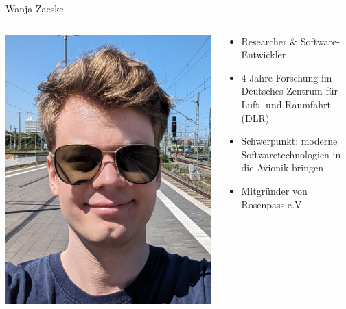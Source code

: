 \begin{frame}{Wanja Zaeske}
  \begin{columns}[fullwidth,c]
    \begin{column}{.3\linewidth}
      \includegraphics[width=.92\linewidth]{graphics/wanja-zaeske.png}
    \end{column}
    \begin{column}{.7\linewidth}
      \begin{itemize}
        \item Researcher \& Software-Entwickler
        \item 4 Jahre Forschung im Deutsches Zentrum für Luft- und Raumfahrt (DLR)
        \item Schwerpunkt: moderne Softwaretechnologien in die Avionik bringen
        \item Mitgründer von Rosenpass e.V.
      \end{itemize}
    \end{column}%
  \end{columns}
\end{frame}

